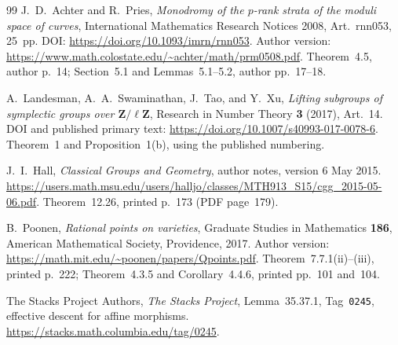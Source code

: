 \documentclass[11pt,a4paper]{article}
\begin{document}
\begin{thebibliography}{99}
J.~D.~Achter and R.~Pries,
\emph{Monodromy of the $p$-rank strata of the moduli space of curves},
International Mathematics Research Notices 2008,
Art.~rnn053, 25~pp.
DOI: \url{https://doi.org/10.1093/imrn/rnn053}.
Author version:
\url{https://www.math.colostate.edu/~achter/math/prm0508.pdf}.
Theorem~4.5, author p.~14; Section~5.1 and Lemmas~5.1--5.2,
author pp.~17--18.

A.~Landesman, A.~A.~Swaminathan, J.~Tao, and Y.~Xu,
\emph{Lifting subgroups of symplectic groups over
$\mathbf Z/\ell\mathbf Z$},
Research in Number Theory \textbf{3} (2017), Art.~14.
DOI and published primary text:
\url{https://doi.org/10.1007/s40993-017-0078-6}.
Theorem~1 and Proposition~1(b), using the published numbering.

J.~I.~Hall, \emph{Classical Groups and Geometry},
author notes, version 6 May 2015.
\url{https://users.math.msu.edu/users/halljo/classes/MTH913_S15/cgg_2015-05-06.pdf}.
Theorem~12.26, printed p.~173 (PDF page~179).

B.~Poonen, \emph{Rational points on varieties},
Graduate Studies in Mathematics \textbf{186},
American Mathematical Society, Providence, 2017.
Author version: \url{https://math.mit.edu/~poonen/papers/Qpoints.pdf}.
Theorem~7.7.1(ii)--(iii), printed p.~222;
Theorem~4.3.5 and Corollary~4.4.6, printed pp.~101 and~104.

The Stacks Project Authors,
\emph{The Stacks Project}, Lemma~35.37.1,
Tag~\texttt{0245}, effective descent for affine morphisms.
\url{https://stacks.math.columbia.edu/tag/0245}.

\end{thebibliography}
\end{document}
